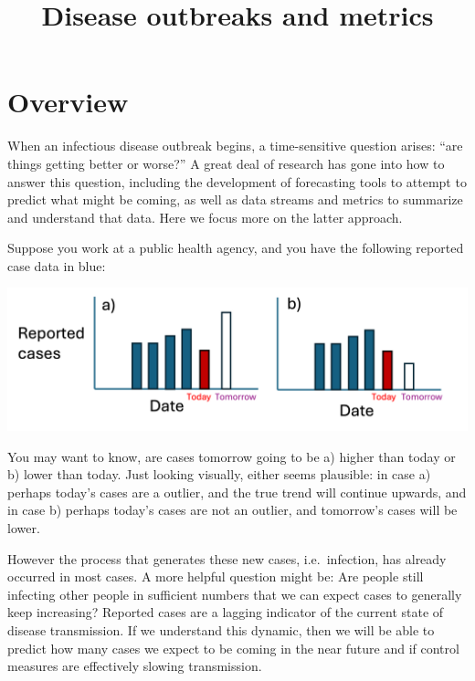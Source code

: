 \documentclass[
  letterpaper,
  DIV=11,
  numbers=noendperiod]{scrreprt}
\title{Disease outbreaks and metrics}
\author{}
\date{}
\renewcommand*\contentsname{Table of contents}
\newcommand\contentsname{Table of contents}
\begin{document}
\maketitle

\renewcommand*\contentsname{Table of contents}
{
\hypersetup{linkcolor=}
\setcounter{tocdepth}{2}
\tableofcontents
}


\chapter*{Overview}\label{overview}


When an infectious disease outbreak begins, a time-sensitive question
arises: ``are things getting better or worse?'' A great deal of research
has gone into how to answer this question, including the development of
forecasting tools to attempt to predict what might be coming, as well as
data streams and metrics to summarize and understand that data. Here we
focus more on the latter approach.

Suppose you work at a public health agency, and you have the following
reported case data in blue:

\includegraphics[width=0.8\linewidth,height=\textheight,keepaspectratio]{img/Tomorrow.png}

You may want to know, are cases tomorrow going to be a) higher than
today or b) lower than today. Just looking visually, either seems
plausible: in case a) perhaps today's cases are a outlier, and the true
trend will continue upwards, and in case b) perhaps today's cases are
not an outlier, and tomorrow's cases will be lower.

However the process that generates these new cases, i.e.~infection, has
already occurred in most cases. A more helpful question might be: Are
people still infecting other people in sufficient numbers that we can
expect cases to generally keep increasing? Reported cases are a lagging
indicator of the current state of disease transmission. If we understand
this dynamic, then we will be able to predict how many cases we expect
to be coming in the near future and if control measures are effectively
slowing transmission.
\end{document}
